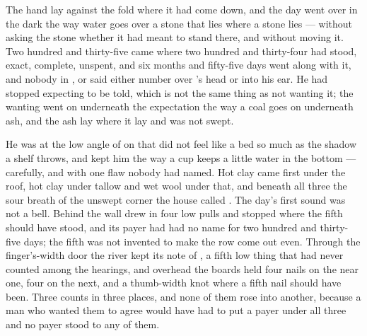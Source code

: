 
The hand lay against the fold where it had come down, and the day went over in the dark the way water goes over a stone that lies where a stone lies --- without asking the stone whether it had meant to stand there, and without moving it. Two hundred and thirty-five came where two hundred and thirty-four had stood, exact, complete, unspent, and six months and fifty-five days went along with it, and nobody in ,  or  said either number over 's head or into his ear. He had stopped expecting to be told, which is not the same thing as not wanting it; the wanting went on underneath the expectation the way a coal goes on underneath ash, and the ash lay where it lay and was not swept.

He was at the low angle of  on  that did not feel like a bed so much as the shadow a shelf throws, and  kept him the way a cup keeps a little water in the bottom --- carefully, and with one flaw nobody had named. Hot clay came first under the roof, hot clay under tallow and wet wool under that, and beneath all three the sour  breath of the unswept corner the house called . The day's first sound was not a bell. Behind the wall  drew in four low pulls and stopped where the fifth should have stood, and its payer had had no name for two hundred and thirty-five days; the fifth was not invented to make the row come out even. Through the finger's-width door the river kept its note of , a fifth low thing that had never counted among the hearings, and overhead the boards held four nails on the near one, four on the next, and a thumb-width knot where a fifth nail should have been. Three counts in three places, and none of them rose into another, because a man who wanted them to agree would have had to put a payer under all three and no payer stood to any of them.

